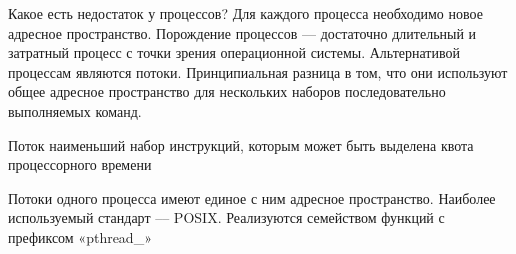 Какое есть недостаток у процессов? Для каждого процесса необходимо новое адресное пространство. Порождение процессов --- достаточно длительный и затратный процесс с точки зрения операционной системы. Альтернативой процессам являются потоки. Принципиальная разница в том, что они используют общее адресное пространство для нескольких наборов последовательно выполняемых команд.

\begin{defi}{Поток}
	наименьший набор инструкций, которым может быть выделена квота процессорного времени 
\end{defi}

Потоки одного процесса имеют единое с ним адресное пространство. Наиболее используемый стандарт –-- POSIX. Реализуются семейством функций с префиксом «pthread\_»